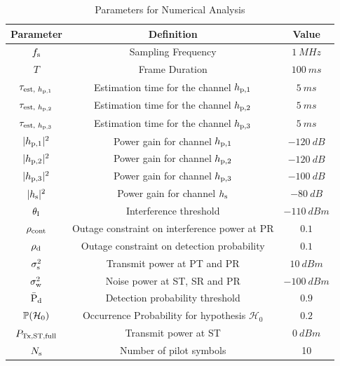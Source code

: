 \begin{table}
\renewcommand{\arraystretch}{1.2}
\caption{Parameters for Numerical Analysis}
\label{tb:tb2}
\centering
\footnotesize{
\begin{tabular}{c||c|c}
\hline
\bfseries Parameter & \bfseries Definition & \bfseries Value \\
\hline\hline
$f_{\text{s}}$ & Sampling Frequency & $\SI{1}{MHz}$ \\ 
$T$ & Frame Duration & $\SI{100}{ms}$ \\ 
$\tau_{\text{est, $h_{\text{p,1}}$}}$ & Estimation time for the channel $h_{\text{p,1}}$ & $\SI{5}{ms}$ \\
$\tau_{\text{est, $h_{\text{p,2}}$}}$ & Estimation time for the channel $h_{\text{p,2}}$ & $\SI{5}{ms}$ \\
$\tau_{\text{est, $h_{\text{p,3}}$}}$ & Estimation time for the channel $h_{\text{p,3}}$ & $\SI{5}{ms}$ \\
$|h_{\text{p,1}}|^2$ & Power gain for channel $h_{\text{p,1}}$ & $\SI{-120}{dB}$ \\ 
$|h_{\text{p,2}}|^2$ & Power gain for channel $h_{\text{p,2}}$ & $\SI{-120}{dB}$ \\ 
$|h_{\text{p,3}}|^2$ & Power gain for channel $h_{\text{p,3}}$ &$\SI{-100}{dB}$ \\ 
$|h_{\text{s}}|^2$ & Power gain for channel $h_{\text{s}}$ &$\SI{-80}{dB}$ \\ 
$\theta_{\text{I}}$ & Interference threshold &$\SI{-110}{dBm}$ \\ 
$\rho_{\text{cont}}$ & Outage constraint on interference power at PR& $0.1$ \\
$\rho_{\text{d}}$ & Outage constraint on detection probability & $0.1$ \\
$\sigma^2_{\text{s}}$ & Transmit power at PT and PR&$\SI{10}{dBm}$ \\
$\sigma^2_{\text{w}}$ & Noise power at ST, SR and PR &$\SI{-100}{dBm}$ \\
$\bar{\text{P}}_{\text{d}}$ & Detection probability threshold  &$0.9$ \\
$\mathbb P(\mathcal{H}_0)$ & Occurrence Probability for hypothesis $\mathcal H_0$ & $0.2$ \\
$P_{\text{Tx,ST,full}}$ & Transmit power at ST &$\SI{0}{dBm}$ \\
$N_{\text{s}}$ & Number of pilot symbols & 10 \\ \hline
\end{tabular}
}
\end{table}

